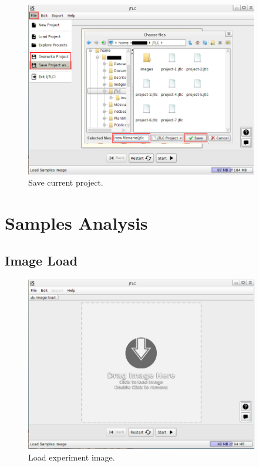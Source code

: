 \begin{figure}[H]
	\vspace{0cm}
	\centering
	\includegraphics[width=385px]{imagenes/save_project}
	\centering
	\vspace{-0.4cm}
	\caption{Save current project.}
	\label{fig:save_project}
	\vspace{-0.25cm}
\end{figure}
\newpage

\chapter{Samples Analysis}
\section{Image Load}
\begin{figure}[H]
	\vspace{0cm}
	\centering
	\includegraphics[width=385px]{imagenes/drop}
	\centering
	\vspace{-0.4cm}
	\caption{Load experiment image.}
	\label{fig:image_load}
	\vspace{-0.25cm}
\end{figure}

